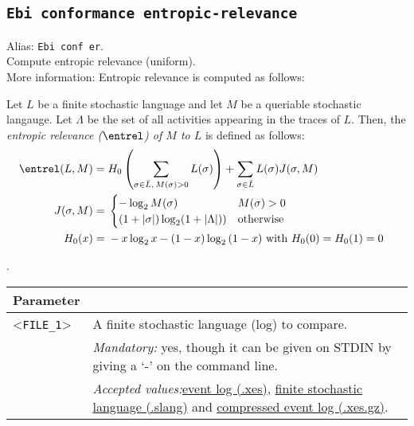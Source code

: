 {\subsection{\texttt{Ebi conformance entropic-relevance}}
\label{command:Ebi conformance entropic-relevance}
Alias: \texttt{Ebi conf er}.\\
Compute entropic relevance (uniform).\\
More information: Entropic relevance is computed as follows:
        
        \begin{definition}
            \label{def:ER}
                Let $L$ be a finite stochastic language and let $M$ be a queriable stochastic langauge.
                Let $\Lambda$ be the set of all activities appearing in the traces of $L$.
                Then, the \emph{entropic relevance ($\entrel$) of $M$ to $L$} is defined as follows: 
                \begin{align*}
                    \entrel(L, M) ={}& H_0\left(\sum_{\sigma \in \bar{L},\, M(\sigma)>0}{L(\sigma)}\right) + 
                    \sum_{\sigma \in \bar{L}}L(\sigma) J(\sigma, M)\\
                    J(\sigma, M) ={}& \begin{cases}
                    -\log_2 M(\sigma) & M(\sigma) > 0\\
                    (1+|\sigma|) \log_2 (1 + |\Lambda|)) & \text{otherwise}
                    \end{cases}\\
                    H_0(x) ={}& -x \log_2{x} - (1-x) \log_2{(1-x)} \text{ with } H_0(0) = H_0(1) = 0 &\\
                \end{align*}       
            \end{definition}.\\
\begin{tabularx}{\linewidth}{lX}
\toprule
Parameter \\\midrule
<\texttt{FILE\_1}>&A finite stochastic language (log) to compare.\\
&\textit{Mandatory:} \quad yes, though it can be given on STDIN by giving a `-' on the command line.\\
&\textit{Accepted values:}\quad \hyperref[filehandler:event log]{event log (.xes)}, \hyperref[filehandler:finite stochastic language]{finite stochastic language (.slang)} and \hyperref[filehandler:compressed event log]{compressed event log (.xes.gz)}.\\

\end{tabularx}}
